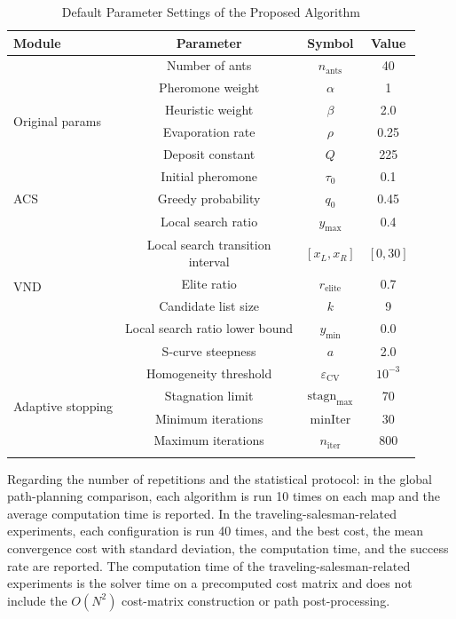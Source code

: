\documentclass[pdflatex,sn-basic,Numbered]{sn-jnl}
\begin{document}
\begin{table}[!ht]
\caption{Default Parameter Settings of the Proposed Algorithm}
\label{tab:params}
\centering
\scriptsize
\begin{tabular}{lccc}
\toprule
Module & Parameter & Symbol & Value \\
\midrule
\multirow{6}{*}{Original params}
& Number of ants & $n_{\mathrm{ants}}$ & 40 \\
& Pheromone weight & $\alpha$ & 1 \\
& Heuristic weight & $\beta$ & 2.0 \\
& Evaporation rate & $\rho$ & 0.25 \\
& Deposit constant & $Q$ & 225 \\
& Initial pheromone & $\tau_0$ & 0.1 \\
\midrule
\multirow{1}{*}{ACS}
& Greedy probability & $q_0$ & 0.45 \\
\midrule
\multirow{6}{*}{VND}
& Local search ratio & $y_{\max}$ & 0.4 \\
& \makecell{Local search transition\\interval} & $[x_L, x_R]$ & $[0, 30]$ \\
& Elite ratio & $r_{\mathrm{elite}}$ & 0.7 \\
& Candidate list size & $k$ & 9 \\
& Local search ratio lower bound & $y_{\min}$ & 0.0 \\
& S-curve steepness & $a$ & 2.0 \\
\midrule
\multirow{4}{*}{Adaptive stopping}
& Homogeneity threshold & $\varepsilon_{\mathrm{CV}}$ & $10^{-3}$ \\
& Stagnation limit & $\mathrm{stagn}_{\max}$ & 70 \\
& Minimum iterations & $\mathrm{minIter}$ & 30 \\
& Maximum iterations & $n_{\mathrm{iter}}$ & 800 \\
\botrule
\end{tabular}
\end{table}

Regarding the number of repetitions and the statistical protocol: in the global path-planning comparison, each algorithm is run 10 times on each map and the average computation time is reported. In the traveling-salesman-related experiments, each configuration is run 40 times, and the best cost, the mean convergence cost with standard deviation, the computation time, and the success rate are reported. The computation time of the traveling-salesman-related experiments is the solver time on a precomputed cost matrix and does not include the $O(N^2)$ cost-matrix construction or path post-processing.
\end{document}
